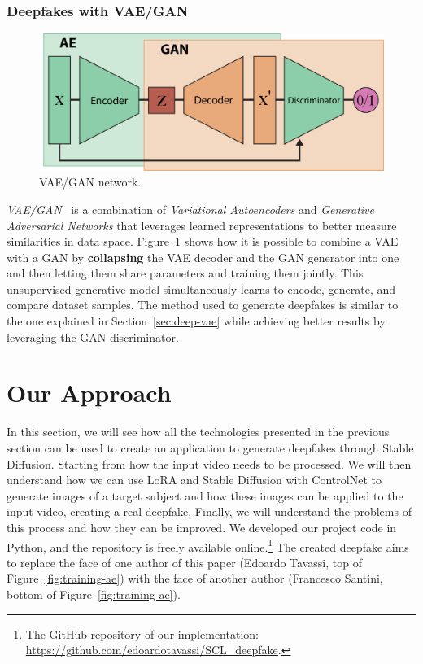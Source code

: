 \documentclass[preprint]{elsarticle}
\begin{document}
\subsubsection{Deepfakes with VAE/GAN}\label{sect:vaegan}

\begin{figure}[b]
	\centering
    \includegraphics[scale=0.75]{img/svg/VaeGan.png}
	\caption{VAE/GAN network.}\label{fig:vae-gan}
\end{figure}


\emph{VAE/GAN}~\cite{larsen2016autoencoding} is a combination of \emph{Variational Autoencoders} and \emph{Generative Adversarial Networks} that leverages learned representations to better measure similarities in data space. Figure~\ref{fig:vae-gan} shows how it is possible to combine a VAE with a GAN by \textbf{collapsing} the VAE decoder and the GAN generator  into one and then letting them share parameters and training them jointly.
This unsupervised generative model simultaneously learns to encode, generate, and compare dataset samples. 
The method used to generate deepfakes is similar to the one explained in Section~\ref{sec:deep-vae} while achieving  better results by leveraging the GAN discriminator.



\section{Our Approach} \label{ch:project}

In this section, we will see how all the technologies presented in the previous  section can be used to create an application to generate deepfakes through Stable Diffusion.  Starting from how the input video needs to be processed.  We will then understand how we can use LoRA and Stable Diffusion with ControlNet to  generate images of a target subject and how these images can be applied to the input video, 
creating a real deepfake.  Finally, we will understand the problems of this process and how they can be improved. We developed our project code in Python, and the repository is freely available online.\footnote{The GitHub repository of our  implementation: \url{https://github.com/edoardotavassi/SCL_deepfake}.} The created deepfake aims to replace the face of one author of this paper (Edoardo Tavassi, top of  Figure~\ref{fig:training-ae}) with the face of another author (Francesco Santini, bottom of  Figure~\ref{fig:training-ae}).
\end{document}
